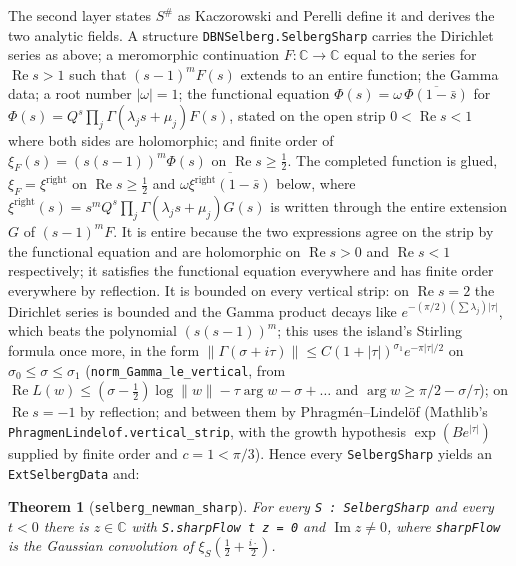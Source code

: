 \documentclass[11pt]{article}
\newtheorem{theorem}{Theorem}
\theoremstyle{definition}
\newcommand{\lean}[1]{\texttt{#1}}
\newcommand{\re}{\operatorname{Re}}
\newcommand{\im}{\operatorname{Im}}
\newcommand{\C}{\mathbb{C}}
\begin{document}
The second layer states $S^\#$ as Kaczorowski and Perelli define it and derives the two analytic fields. A structure \lean{DBNSelberg.SelbergSharp} carries the Dirichlet series as above; a meromorphic continuation $F:\C\to\C$ equal to the series for $\re s>1$ such that $(s-1)^m F(s)$ extends to an entire function; the Gamma data; a root number $|\omega| = 1$; the functional equation $\Phi(s) = \omega\,\overline{\Phi(1-\bar s)}$ for $\Phi(s) = Q^s\prod_j\Gamma(\lambda_j s+\mu_j)F(s)$, stated on the open strip $0<\re s<1$ where both sides are holomorphic; and finite order of $\xi_F(s) = (s(s-1))^m\Phi(s)$ on $\re s \ge \tfrac12$. The completed function is glued, $\xi_F = \xi^{\mathrm{right}}$ on $\re s\ge\tfrac12$ and $\omega\overline{\xi^{\mathrm{right}}(1-\bar s)}$ below, where $\xi^{\mathrm{right}}(s) = s^m Q^s\prod_j\Gamma(\lambda_j s + \mu_j)G(s)$ is written through the entire extension $G$ of $(s-1)^mF$. It is entire because the two expressions agree on the strip by the functional equation and are holomorphic on $\re s>0$ and $\re s<1$ respectively; it satisfies the functional equation everywhere and has finite order everywhere by reflection. It is bounded on every vertical strip: on $\re s = 2$ the Dirichlet series is bounded and the Gamma product decays like $e^{-(\pi/2)(\sum\lambda_j)|\tau|}$, which beats the polynomial $(s(s-1))^m$; this uses the island's Stirling formula once more, in the form $\|\Gamma(\sigma+i\tau)\| \le C(1+|\tau|)^{\sigma_1}e^{-\pi|\tau|/2}$ on $\sigma_0\le\sigma\le\sigma_1$ (\lean{norm\_Gamma\_le\_vertical}, from $\re L(w) \le (\sigma-\tfrac12)\log\|w\| - \tau\arg w - \sigma + \dots$ and $\arg w \ge \pi/2 - \sigma/\tau$); on $\re s = -1$ by reflection; and between them by Phragm\'en--Lindel\"of (Mathlib's \lean{PhragmenLindelof.vertical\_strip}, with the growth hypothesis $\exp(B e^{|\tau|})$ supplied by finite order and $c = 1 < \pi/3$). Hence every \lean{SelbergSharp} yields an \lean{ExtSelbergData} and:

\begin{theorem}[\lean{selberg\_newman\_sharp}]
For every \lean{S : SelbergSharp} and every $t<0$ there is $z\in\C$ with \lean{S.sharpFlow t z = 0} and $\im z\ne0$, where \lean{sharpFlow} is the Gaussian convolution of $\xi_S(\tfrac12 + \tfrac{i\cdot}{2})$.
\end{theorem}
\end{document}
